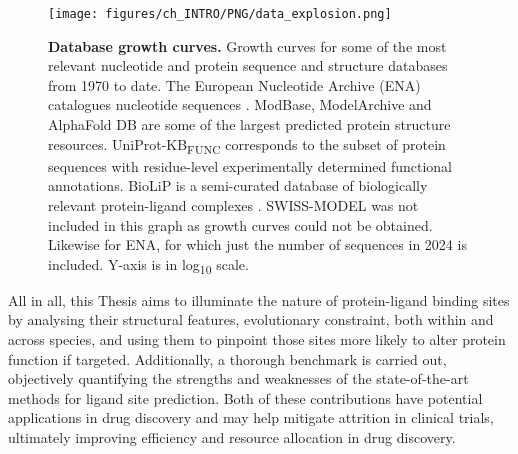 \begin{figure}[htb!]
    \centering
    \texttt{[image: figures/ch\_INTRO/PNG/data\_explosion.png]}
    \caption[Database growth curves]{\textbf{Database growth curves.}  Growth curves for some of the most relevant nucleotide and protein sequence and structure databases from 1970 to date. The European Nucleotide Archive (ENA) catalogues nucleotide sequences \cite{LEINONEN_2010_ENA}. ModBase, ModelArchive and AlphaFold DB are some of the largest predicted protein structure resources. UniProt-KB\textsubscript{FUNC} corresponds to the subset of protein sequences with residue-level experimentally determined functional annotations. BioLiP is a semi-curated database of biologically relevant protein-ligand complexes \cite{YANG_2013_BIOLIP}. SWISS-MODEL was not included in this graph as growth curves could not be obtained. Likewise for ENA, for which just the number of sequences in 2024 is included. Y-axis is in log\textsubscript{10} scale.}
    \label{fig:data_explosion}
\end{figure}

All in all, this Thesis aims to illuminate the nature of protein-ligand binding sites by analysing their structural features, evolutionary constraint, both within and across species, and using them to pinpoint those sites more likely to alter protein function if targeted. Additionally, a thorough benchmark is carried out, objectively quantifying the strengths and weaknesses of the state-of-the-art methods for ligand site prediction. Both of these contributions have potential applications in drug discovery and may help mitigate attrition in clinical trials, ultimately improving efficiency and resource allocation in drug discovery.
